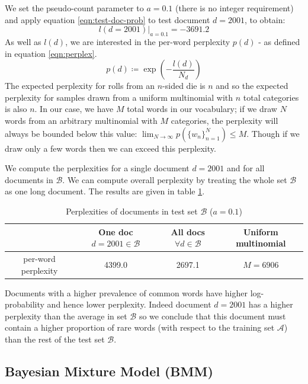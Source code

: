 \documentclass[]{article}
\newcommand{\Acal}{\mathcal{A}}
\newcommand{\Bcal}{\mathcal{B}}
\begin{document}
We set the pseudo-count parameter to $a=0.1$ (there is no integer requirement) and apply equation \ref{eqn:test-doc-prob} to test document $d=2001$, to obtain:
%
\begin{equation}
	l(d=2001)|_{a=0.1} = -3691.2
\end{equation}
%
As well as $l(d)$, we are interested in the per-word perplexity $p(d)$ - as defined in equation \ref{eqn:perplex}.
%
\begin{equation}
p(d) \coloneqq \exp \left(- \frac{l(d)}{N_d} \right)
\label{eqn:perplex}
\end{equation}
%
The expected perplexity for rolls from an $n$-sided die is $n$ and so the expected perplexity for samples drawn from a uniform multinomial with $n$ total categories is also $n$. In our case, we have $M$ total words in our vocabulary; if we draw $N$ words from an arbitrary multinomial with $M$ categories, the perplexity will always be bounded below this value: $\lim_{N \rightarrow \infty}p(\{w_n\}_{n=1}^{N}) \leq M$. Though if we draw only a few words then we can exceed this perplexity.

We compute the perplexities for a single document $d=2001$ and for all documents in $\Bcal$. We can compute overall perplexity by treating the whole set $\Bcal$ as one long document. The results are given in table \ref{tab:perplex}.
%
\begin{table}[!h]
	\centering
	\begin{tabular}{c | c c c}
		& One doc $d=2001 \in \Bcal$ & All docs $\forall d \in \Bcal$ & Uniform multinomial \\ \hline
		per-word perplexity & 4399.0 & 2697.1 & $M=6906$
	\end{tabular}
\caption{Perplexities of documents in test set $\Bcal$ ($a=0.1$)}
\label{tab:perplex}
\end{table}

Documents with a higher prevalence of common words have higher log-probability and hence lower perplexity. Indeed document $d=2001$ has a higher perplexity than the average in set $\Bcal$ so we conclude that this document must contain a higher proportion of rare words (with respect to the training set $\Acal$) than the rest of the test set $\Bcal$.

\clearpage
\subsection{Bayesian Mixture Model (BMM)}
\end{document}
